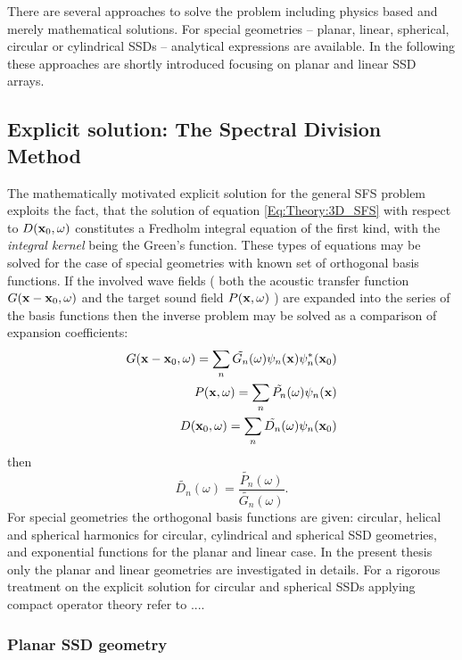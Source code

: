 There are several approaches to solve the problem including physics based and merely mathematical solutions. For special geometries -- planar, linear, spherical, circular or cylindrical SSDs -- analytical expressions are available. In the following these approaches are shortly introduced focusing on planar and linear SSD arrays.

\subsection{Explicit solution: The Spectral Division Method}

The mathematically motivated explicit solution for the general SFS problem exploits the fact, that the solution of equation \eqref{Eq:Theory:3D_SFS} with respect to $D(\mathbf{x}_0, \omega)$ constitutes a Fredholm integral equation of the first kind, with the \emph{integral kernel} being the Green's function.
These types of equations may be solved for the case of special geometries with known set of orthogonal basis functions.  
If the involved wave fields ( both the acoustic transfer function $G(\mathbf{x} - \mathbf{x}_0 , \omega )$ and the target sound field $P(\mathbf{x},\omega)$ ) are expanded into the series of the basis functions then the inverse problem may be solved as a comparison of expansion coefficients:
\begin{eqnarray}
G(\mathbf{x} - \mathbf{x}_0 , \omega ) = \sum_n \tilde{G_n}(\omega) \psi_{n}(\mathbf{x}) \psi_{n}^{*}(\mathbf{x}_0)
\\
P(\mathbf{x},\omega) = \sum_n \tilde{P_n}(\omega)\psi_n(\mathbf{x})
\\
D(\mathbf{x}_0,\omega) = \sum_n \tilde{D_n}(\omega)\psi_n(\mathbf{x}_0)
\end{eqnarray}
then
\begin{equation}
\tilde{D_n}(\omega) = \frac{\tilde{P_n}(\omega)}{\tilde{G_n}(\omega)}.
\end{equation}
For special geometries the orthogonal basis functions are given: circular, helical and spherical harmonics for circular, cylindrical and spherical SSD geometries, and exponential functions for the planar and linear case.
In the present thesis only the planar and linear geometries are investigated in details. For a rigorous treatment on the explicit solution for circular and spherical SSDs applying compact operator theory refer to ....

\subsubsection{Planar SSD geometry}

